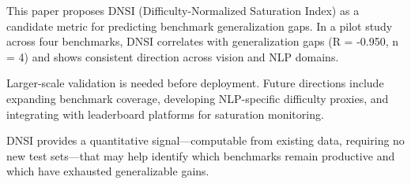 
This paper proposes DNSI (Difficulty-Normalized Saturation Index) as a candidate metric for predicting benchmark generalization gaps. In a pilot study across four benchmarks, DNSI correlates with generalization gaps (R = -0.950, n = 4) and shows consistent direction across vision and NLP domains.

Larger-scale validation is needed before deployment. Future directions include expanding benchmark coverage, developing NLP-specific difficulty proxies, and integrating with leaderboard platforms for saturation monitoring.

DNSI provides a quantitative signal---computable from existing data, requiring no new test sets---that may help identify which benchmarks remain productive and which have exhausted generalizable gains.
